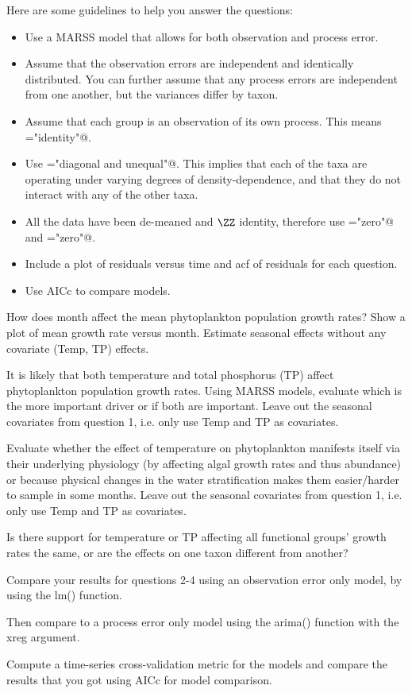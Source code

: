Here are some guidelines to help you answer the questions:
\begin{itemize}
\item Use a MARSS model that allows for both observation and process error. 
\item Assume that the observation errors are independent and identically distributed. You can further assume that any process errors are independent from one another, but the variances differ by taxon.
\item Assume that each group is an observation of its own process. This means \verb@Z="identity"@.
\item Use \verb@B="diagonal and unequal"@.  This implies that each of the taxa are operating under varying degrees of density-dependence, and that they do not interact with any of the other taxa.
\item All the data have been de-meaned and $\ZZ$ identity, therefore use \verb@U="zero"@ and \verb@A="zero"@.  
\item Include a plot of residuals versus time and acf of residuals for each question.
\item Use AICc to compare models.
\end{itemize}

\begin{hwenumerate}
\item  How does month affect the mean phytoplankton population growth rates? Show a plot of mean growth rate versus month. Estimate seasonal effects without any covariate (Temp, TP) effects.
\item	It is likely that both temperature and total phosphorus (TP) affect phytoplankton population growth rates. Using MARSS models, evaluate which is the more important driver or if both are important. Leave out the seasonal covariates from question 1, i.e. only use Temp and TP as covariates.
\item  Evaluate whether the effect of temperature on phytoplankton manifests itself via their underlying physiology (by affecting algal growth rates and thus abundance) or because physical changes in the water stratification makes them easier/harder to sample in some months. Leave out the seasonal covariates from question 1, i.e. only use Temp and TP as covariates.
\item	Is there support for temperature or TP  affecting all functional groups' growth rates the same, or are the effects on one taxon different from another?
\item Compare your results for questions 2-4 using an observation error only model, by using the lm() function.
\item Then compare to a process error only model using the arima() function with the xreg argument.  
\item Compute a time-series cross-validation metric for the models and compare the results that you got using AICc for model comparison.
\end{hwenumerate}






